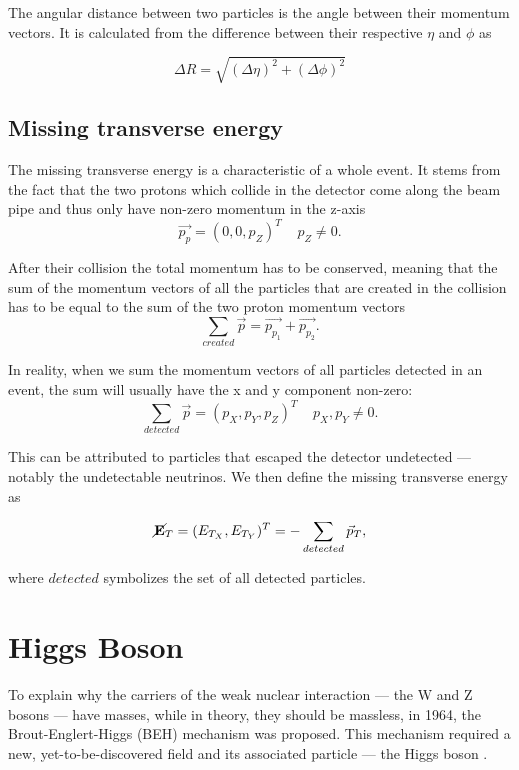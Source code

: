 \documentclass{ctuthesis}
\begin{document}
The angular distance between two particles is the angle between their momentum vectors. It is calculated from the difference between their respective $\eta$ and $\phi$ as \cite[p.22]{decay_channel_image}

\begin{equation}
    \Delta R = \sqrt{(\Delta \eta)^2 + (\Delta \phi)^2}
\end{equation}


\subsection{Missing transverse energy}

The missing transverse energy is a characteristic of a whole event. It stems from the fact that the two protons which collide in the detector come along the beam pipe and thus only have non-zero momentum in the z-axis 
\[\vec{p_p} = (0,0,p_Z)^T \;\;\;\; p_Z \neq 0.\]

After their collision the total momentum has to be conserved, meaning that the sum of the momentum vectors of all the particles that are created in the collision has to be equal to the sum of the two proton momentum vectors
\[\sum_{created} \vec{p} = \vec{p_{p_1}} + \vec{p_{p_2}}.\]

In reality, when we sum the momentum vectors of all particles detected in an event, the sum will usually have the x and y component non-zero:
\[ \sum_{detected} \vec{p} = (p_X,p_Y,p_Z)^T \;\;\;\; p_X,p_Y \neq 0.\]

This can be attributed to particles that escaped the detector undetected — notably the undetectable neutrinos. We then define the missing transverse energy as \cite{missing_transverse_energy}

\begin{equation}
    \cancel{\mathbf{E}}_T = (E_{T_X}, E_{T_Y})^T = -\sum_{detected} \vec{p}_T,
\label{met_equation}
\end{equation}

where $detected$ symbolizes the set of all detected particles.




\section{Higgs Boson}
To explain why the carriers of the weak nuclear interaction — the W and Z bosons — have masses, while in theory, they should be massless, in 1964, the Brout-Englert-Higgs (BEH) mechanism was proposed. This mechanism required a new, yet-to-be-discovered field and its associated particle — the Higgs boson \cite{higgs}.
\end{document}
